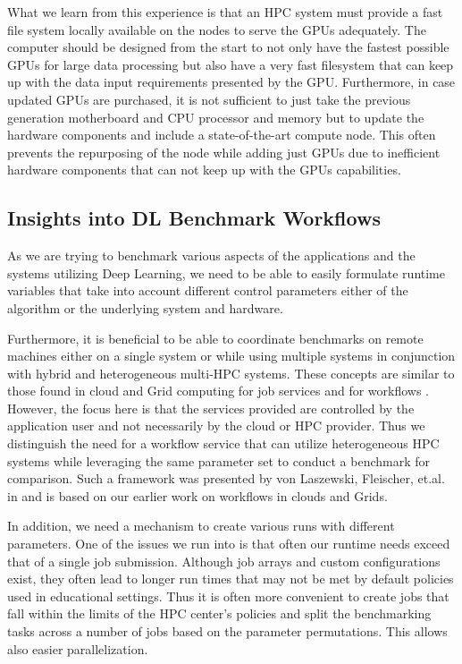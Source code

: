 \documentclass[utf8]{FrontiersinVancouver} %
\begin{document}
What we learn from this experience is that an HPC system must provide a fast file system locally available on the nodes to serve the GPUs adequately. The computer should be designed from the start to not only have the fastest possible GPUs for large data processing but also have a very fast filesystem that can keep up with the data input requirements presented by the GPU. Furthermore, in case updated GPUs are purchased, it is not sufficient to just take the previous generation motherboard and CPU processor and memory but to update the hardware components and include a state-of-the-art compute node. This often prevents the repurposing of the node while adding just GPUs due to inefficient hardware components that can not keep up with the GPUs capabilities.

  


\subsection{Insights into DL Benchmark Workflows}
\label{sec:workflow-main}

As we are trying to benchmark various aspects of the applications and the systems utilizing Deep Learning, we need to be able to easily formulate runtime variables that take into account different control parameters either of the algorithm or the underlying system and hardware.

Furthermore, it is beneficial to be able to coordinate benchmarks on remote machines either on a single system or while using multiple systems in conjunction with hybrid and heterogeneous multi-HPC systems. These concepts are similar to those found in cloud and Grid computing for job services \citep{las-infogram} and for workflows \citep{las-workflow,las07-workflow}. However, the focus here is that the services provided are controlled by the application user and not necessarily by the cloud or HPC provider. Thus we distinguish the need for a workflow service that can utilize heterogeneous HPC systems while leveraging the same parameter set to conduct a benchmark for comparison. Such a framework was presented by von Laszewski, Fleischer, et.al. in \citep{las-22-arxiv-workflow-cc} and is based on our earlier work on workflows in clouds and Grids.

In addition, we need a mechanism to create various runs with different parameters. One of the issues we run into is that often our runtime needs exceed that of a single job submission. Although job arrays and custom configurations exist, they often lead to longer run times that may not be met by default policies used in educational settings. Thus it is often more convenient to create jobs that fall within the limits of the HPC center's policies and split the benchmarking tasks across a number of jobs based on the parameter permutations. This allows also easier parallelization.
\end{document}
